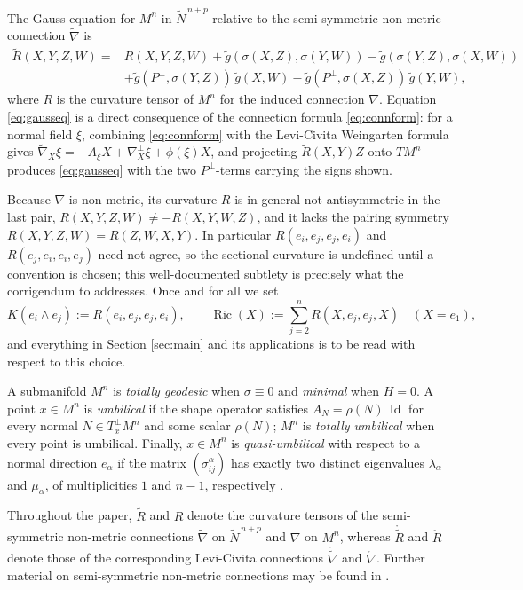 \documentclass[11pt]{article}
\theoremstyle{definition}
\newcommand{\tN}{\widetilde{N}}
\newcommand{\tg}{\widetilde{g}}
\newcommand{\tnabla}{\widetilde{\nabla}}
\newcommand{\ctnabla}{\mathring{\widetilde{\nabla}}}
\newcommand{\tR}{\widetilde{R}}
\newcommand{\ctR}{\mathring{\widetilde{R}}}
\newcommand{\cnabla}{\mathring{\nabla}}
\newcommand{\cR}{\mathring{R}}
\newcommand{\Ric}{\operatorname{Ric}}
\newcommand{\Id}{\operatorname{Id}}
\begin{document}
The Gauss equation for $M^n$ in $\tN^{\,n+p}$ relative to the semi-symmetric non-metric connection $\tnabla$ is \cite{AC2}
\begin{equation}\label{eq:gausseq}
\begin{aligned}
\tR(X,Y,Z,W)={}&R(X,Y,Z,W)+\tg(\sigma(X,Z),\sigma(Y,W))-\tg(\sigma(Y,Z),\sigma(X,W))\\
&+\tg(P^\perp,\sigma(Y,Z))\,\tg(X,W)-\tg(P^\perp,\sigma(X,Z))\,\tg(Y,W),
\end{aligned}
\end{equation}
where $R$ is the curvature tensor of $M^n$ for the induced connection $\nabla$. Equation \eqref{eq:gausseq} is a direct consequence of the connection formula \eqref{eq:connform}: for a normal field $\xi$, combining \eqref{eq:connform} with the Levi-Civita Weingarten formula gives $\tnabla_X\xi=-A_\xi X+\nabla^\perp_X\xi+\phi(\xi)X$, and projecting $\tR(X,Y)Z$ onto $TM^n$ produces \eqref{eq:gausseq} with the two $P^\perp$-terms carrying the signs shown.

Because $\nabla$ is non-metric, its curvature $R$ is in general not antisymmetric in the last pair, $R(X,Y,Z,W)\neq-R(X,Y,W,Z)$, and it lacks the pairing symmetry $R(X,Y,Z,W)=R(Z,W,X,Y)$. In particular $R(e_i,e_j,e_j,e_i)$ and $R(e_j,e_i,e_i,e_j)$ need not agree, so the sectional curvature is undefined until a convention is chosen; this well-documented subtlety is precisely what the corrigendum \cite{OM2} to \cite{OM1} addresses. Once and for all we set
\begin{equation}\label{eq:convention}
K(e_i\wedge e_j):=R(e_i,e_j,e_j,e_i),\qquad \Ric(X):=\sum_{j=2}^{n}R(X,e_j,e_j,X)\quad(X=e_1),
\end{equation}
and everything in Section \ref{sec:main} and its applications is to be read with respect to this choice.


A submanifold $M^n$ is \emph{totally geodesic} when $\sigma\equiv0$ and \emph{minimal} when $H=0$. A point $x\in M^n$ is \emph{umbilical} if the shape operator satisfies $A_N=\rho(N)\,\Id$ for every normal $N\in T^\perp_xM^n$ and some scalar $\rho(N)$; $M^n$ is \emph{totally umbilical} when every point is umbilical. Finally, $x\in M^n$ is \emph{quasi-umbilical} with respect to a normal direction $e_\alpha$ if the matrix $(\sigma^\alpha_{ij})$ has exactly two distinct eigenvalues $\lambda_\alpha$ and $\mu_\alpha$, of multiplicities $1$ and $n-1$, respectively \cite{Hineva3}.

Throughout the paper, $\tR$ and $R$ denote the curvature tensors of the semi-symmetric non-metric connections $\tnabla$ on $\tN^{\,n+p}$ and $\nabla$ on $M^n$, whereas $\ctR$ and $\cR$ denote those of the corresponding Levi-Civita connections $\ctnabla$ and $\cnabla$. Further material on semi-symmetric non-metric connections may be found in \cite{DK,SDB}.
\end{document}
